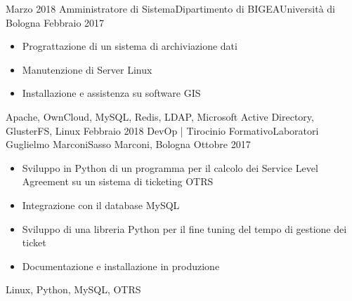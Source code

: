 %
%
%

\begin{experiences}
  \experience
    {Marzo 2018}   {Amministratore di Sistema}{Dipartimento di BIGEA}{Universit\`a di Bologna}
    {Febbraio 2017} {
                      \begin{itemize}
                        \item Prograttazione di un sistema di archiviazione dati
                        \item Manutenzione di Server Linux
                        \item Installazione e assistenza su software GIS
                      \end{itemize}
                    }
                    {Apache, OwnCloud, MySQL, Redis, LDAP, Microsoft Active Directory, GlusterFS, Linux}
  \experience
    {Febbraio 2018} {DevOp | Tirocinio Formativo}{Laboratori Guglielmo Marconi}{Sasso Marconi, Bologna}
    {Ottobre 2017}    {
                      \begin{itemize}
                        \item Sviluppo in Python di un programma per il calcolo dei Service Level Agreement su un sistema di ticketing OTRS
                        \item Integrazione con il database MySQL
                        \item Sviluppo di una libreria Python per il fine tuning del tempo di gestione dei ticket
                        \item Documentazione e installazione in produzione
                      \end{itemize}
                    }
                    {Linux, Python, MySQL, OTRS}
  \emptySeparator
\end{experiences}
